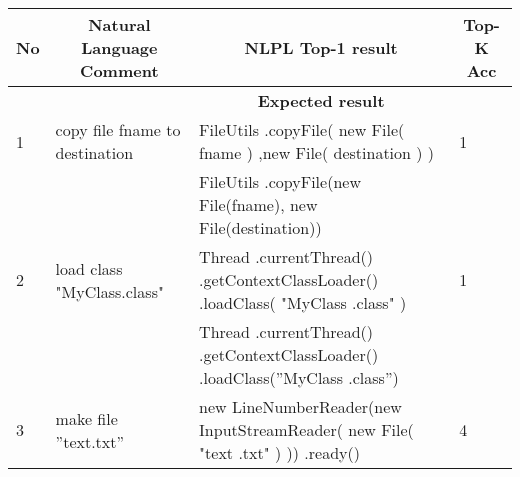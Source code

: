 \begin{longtable}{|p{}|p{}|p{}|p{}|}

		\hline
		\multicolumn{1}{|c|}{\cellcolor[HTML]{FFCCC9}\textbf{No}} & \multicolumn{1}{c|}{\cellcolor[HTML]{FFCCC9}\textbf{Natural Language Comment}} & \multicolumn{1}{c|}{\cellcolor[HTML]{FFCCC9}\textbf{NLPL Top-1 result}}                                          & \multicolumn{1}{c|}{\cellcolor[HTML]{FFCCC9}\textbf{Top-K Acc}} \\ \hline
		\cellcolor[HTML]{9AFF99}&   \cellcolor[HTML]{9AFF99}                                                     & \multicolumn{1}{c|}{\cellcolor[HTML]{9AFF99}\textbf{Expected result}}                                            &                 \cellcolor[HTML]{9AFF99}                        \\ \hline
		\rowcolor[HTML]{FFCCC9} 
		1                                 & copy file fname to destination                         & FileUtils .copyFile( new File( fname ) ,new File( destination ) )                                                & 1                                       \\ \hline
		\rowcolor[HTML]{9AFF99} 
		&                                                        & FileUtils .copyFile(new File(fname), new File(destination))                                                      &                                         \\ \hline
		\rowcolor[HTML]{FFCCC9} 
		2                                 & load class "MyClass.class"                             & Thread .currentThread() .getContextClassLoader() .loadClass( "MyClass .class" )                                  & 1                                       \\ \hline
		\rowcolor[HTML]{9AFF99} 
		&                                                        & Thread .currentThread() .getContextClassLoader() .loadClass(”MyClass .class”)                                    &                                         \\ \hline
		\rowcolor[HTML]{FFCCC9} 
		3                                 & make file ”text.txt”                                   & new LineNumberReader(new InputStreamReader( new File( "text .txt" ) )) .ready()                                  & 4                                       \\ \hline

\end{longtable}

